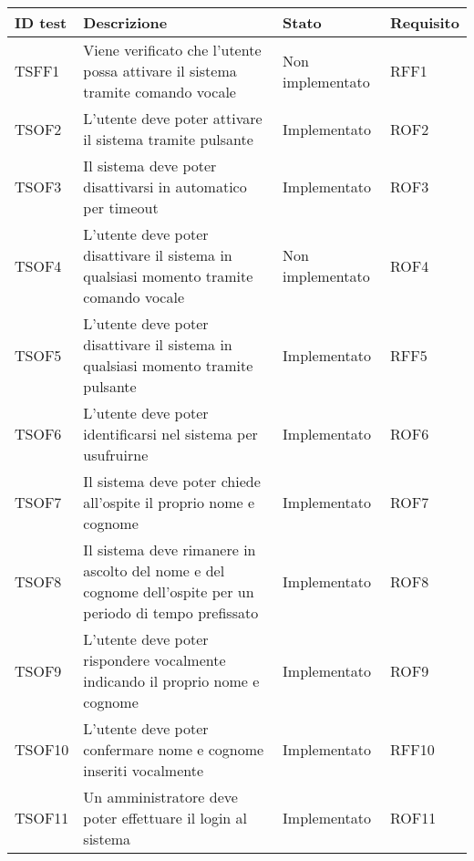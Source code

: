 \documentclass[../PianoDiQualifica_v3.0.0.tex]{subfiles}
\begin{document}
	\begin{longtable}[c] { >{\centering\arraybackslash}p{2cm} p{7cm} >{\centering\arraybackslash}p{4cm} >{\centering\arraybackslash}p{2cm}}
		\toprule
		\centerline{\textbf{ID test}} & \centerline{\textbf{Descrizione}} & \centerline{\textbf{Stato}} & \centerline{\textbf{Requisito}}\\
			\midrule
			TSFF1 & Viene verificato che l'utente possa attivare il sistema tramite comando vocale & Non implementato & RFF1 \\
			\addlinespace[0.3em]
			\midrule
			\addlinespace[0.3em]
			TSOF2 & L'utente deve poter attivare il sistema tramite pulsante & Implementato & ROF2 \\
			\addlinespace[0.3em]
			\midrule
			\addlinespace[0.3em]
			TSOF3 & Il sistema deve poter disattivarsi in automatico per timeout & Implementato & ROF3 \\
			\addlinespace[0.3em]
			\midrule
			\addlinespace[0.3em]
			TSOF4 & L'utente deve poter disattivare il sistema in qualsiasi momento tramite comando vocale & Non implementato & ROF4 \\
			\addlinespace[0.3em]
			\midrule
			\addlinespace[0.3em]
			TSOF5 & L'utente deve poter disattivare il sistema in qualsiasi momento tramite pulsante & Implementato & RFF5 \\
			\addlinespace[0.3em]
			\midrule
			\addlinespace[0.3em]
			TSOF6 & L'utente deve poter identificarsi nel sistema per usufruirne & Implementato & ROF6 \\
			\addlinespace[0.3em]
			\midrule
			\addlinespace[0.3em]
			TSOF7 & Il sistema deve poter chiede all'ospite il proprio nome e cognome & Implementato & ROF7 \\
			\addlinespace[0.3em]
			\midrule
			\addlinespace[0.3em]
			TSOF8 & Il sistema deve rimanere in ascolto del nome e del cognome dell'ospite per un periodo di tempo prefissato & Implementato & ROF8 \\
			\addlinespace[0.3em]
			\midrule
			\addlinespace[0.3em]
			TSOF9 & L'utente deve poter rispondere vocalmente indicando il proprio nome e cognome & Implementato & ROF9 \\
			\addlinespace[0.3em]
			\midrule
			\addlinespace[0.3em]
			TSOF10 & L'utente deve poter confermare nome e cognome inseriti vocalmente & Implementato & RFF10 \\
			\addlinespace[0.3em]
			\midrule
			\addlinespace[0.3em]
			TSOF11 & Un amministratore deve poter effettuare il login al sistema & Implementato & ROF11 \\

\end{longtable}
\end{document}
